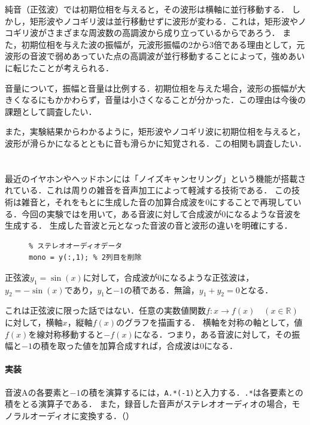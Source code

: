 \consideration
純音（正弦波）では初期位相を与えると，その波形は横軸に並行移動する．
しかし，矩形波やノコギリ波は並行移動せずに波形が変わる．これは，矩形波やノコギリ波がさまざまな周波数の高調波から成り立っているからであろう．
また，初期位相を与えた波の振幅が，元波形振幅の2から3倍である理由として，元波形の音波で弱めあっていた点の高調波が並行移動することによって，強めあいに転じたことが考えられる．\par
音量について，振幅と音量は比例する．初期位相を与えた場合，波形の振幅が大きくなるにもかかわらず，音量は小さくなることが分かった．この理由は今後の課題として調査したい．\par
また，実験結果からわかるように，矩形波やノコギリ波に初期位相を与えると，波形が滑らかになるとともに音も滑らかに知覚される．この相関も調査したい．
\section{\kadaicb}\label{sec:\kadaicb}
\purpose
最近のイヤホンやヘッドホンには「ノイズキャンセリング」という機能が搭載されている．これは周りの雑音を音声加工によって軽減する技術である．
この技術は雑音と，それをもとに生成した音の加算合成波を\(0\)にすることで再現している．今回の実験では\matlab を用いて，ある音波に対して合成波が\(0\)になるような音波を生成する．
生成した音波と元となった音波の音と波形の違いを明確にする．
\method
\begin{figure}
    \vspace{-1cm}
    \centering
    \begin{lstlisting}[caption={モノラルへの変換},label={src:モノラルへの変換},numbers={none}]
% y : N行2列
% ステレオオーディオデータ
mono = y(:,1); % 2列目を削除
    \end{lstlisting}
    \vspace{-1cm}
\end{figure}
正弦波\(y_1=\sin(x)\)に対して，合成波が\(0\)になるような正弦波は，\(y_2=-\sin(x)\)であり，\(y_1\)と\(-1\)の積である．無論，\(y_1+y_2=0\)となる．\par
これは正弦波に限った話ではない．任意の実数値関数\(f:x\longrightarrow f(x)\quad(x\in\mathbb{R})\)に対して，横軸\(x\)，縦軸\(f(x)\)のグラフを描画する．
横軸を対称の軸として，値\(f(x)\)を線対称移動すると\(-f(x)\)になる．つまり，ある音波に対して，その振幅と\(-1\)の積を取った値を加算合成すれば，合成波は\(0\)になる．
\paragraph{実装}
音波Aの各要素と\(-1\)の積を演算するには，\texttt{A.*(-1)}と入力する．\texttt{.*}は各要素との積をとる演算子である．
また，録音した音声がステレオオーディオの場合，モノラルオーディオに変換する．（）
